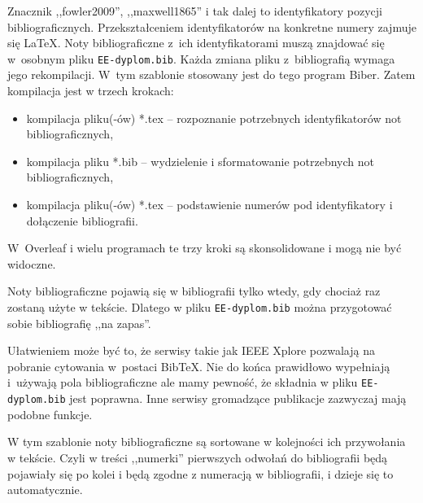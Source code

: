 Znacznik ,,fowler2009'', ,,maxwell1865'' i tak dalej to identyfikatory pozycji bibliograficznych. Przekształceniem identyfikatorów na konkretne numery zajmuje się \LaTeX{}. Noty bibliograficzne z~ich identyfikatorami muszą znajdować się w~osobnym pliku \texttt{EE-dyplom.bib}. Każda zmiana pliku z~bibliografią wymaga jego rekompilacji. W~tym szablonie stosowany jest do tego program Biber. Zatem kompilacja jest w trzech krokach:
\begin{itemize}
	\item kompilacja pliku(-ów) *.tex -- rozpoznanie potrzebnych identyfikatorów not bibliograficznych,
	\item kompilacja pliku *.bib -- wydzielenie i sformatowanie potrzebnych not bibliograficznych,
	\item kompilacja pliku(-ów) *.tex -- podstawienie numerów pod identyfikatory i dołączenie bibliografii.
\end{itemize}
W~Overleaf i wielu programach te trzy kroki są skonsolidowane i mogą nie być widoczne. 

Noty bibliograficzne pojawią się w bibliografii tylko wtedy, gdy chociaż raz zostaną użyte w tekście. Dlatego w pliku \texttt{EE-dyplom.bib} można przygotować sobie bibliografię ,,na zapas''.

Ułatwieniem może być to, że serwisy takie jak IEEE Xplore pozwalają na pobranie cytowania w~postaci BibTeX. Nie do końca prawidłowo wypełniają i~używają pola bibliograficzne ale mamy pewność, że składnia w pliku \texttt{EE-dyplom.bib} jest poprawna. Inne serwisy gromadzące publikacje zazwyczaj mają podobne funkcje.

W tym szablonie noty bibliograficzne są sortowane w kolejności ich przywołania w tekście. Czyli w treści ,,numerki'' pierwszych odwołań do bibliografii będą pojawiały się po kolei i będą zgodne z numeracją w bibliografii, i dzieje się to automatycznie.
